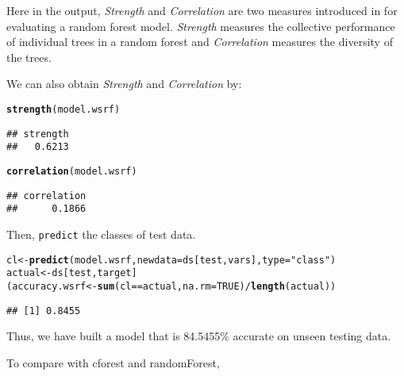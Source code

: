 \documentclass[11pt,a4paper]{article}\usepackage{graphicx, color}
\makeatletter
\newcommand{\hlfunctioncall}[1]{\textcolor[rgb]{0.501960784313725,0,0.329411764705882}{\textbf{#1}}}%
\newcommand{\hlstring}[1]{\textcolor[rgb]{0.6,0.6,1}{#1}}%
\newenvironment{kframe}{%
 \def\at@end@of@kframe{}%
 \ifinner\ifhmode%
  \def\at@end@of@kframe{\end{minipage}}%
  \begin{minipage}{\columnwidth}%
 \fi\fi%
 \def\FrameCommand##1{\hskip\@totalleftmargin \hskip-\fboxsep
 \colorbox{shadecolor}{##1}\hskip-\fboxsep
     \hskip-\linewidth \hskip-\@totalleftmargin \hskip\columnwidth}%
 \MakeFramed {\advance\hsize-\width
   \@totalleftmargin\z@ \linewidth\hsize
   \@setminipage}}%
 {\par\unskip\endMakeFramed%
 \at@end@of@kframe}
\newenvironment{knitrout}{}{} %
\newcommand{\code}[1]{\texttt{#1}}
\newcommand{\pkg}[1]{{\fontseries{b}\selectfont #1}}
\makeatother
\begin{document}
Here in the output, \textit{Strength} and \textit{Correlation} are two
measures introduced in \cite{breiman2001random} for evaluating a
random forest model.  \textit{Strength} measures the collective
performance of individual trees in a random forest and
\textit{Correlation} measures the diversity of the trees.

We can also obtain \textit{Strength} and \textit{Correlation} by:

\begin{knitrout}
\color{fgcolor}\begin{kframe}
\begin{alltt}
\hlfunctioncall{strength}(model.wsrf)
\end{alltt}
\begin{verbatim}
## strength 
##   0.6213
\end{verbatim}
\begin{alltt}
\hlfunctioncall{correlation}(model.wsrf)
\end{alltt}
\begin{verbatim}
## correlation 
##      0.1866
\end{verbatim}
\end{kframe}
\end{knitrout}


Then, \code{predict} the classes of test data.

\begin{knitrout}
\color{fgcolor}\begin{kframe}
\begin{alltt}
cl <- \hlfunctioncall{predict}(model.wsrf, newdata=ds[test, vars], type=\hlstring{"class"})
actual <- ds[test, target]
(accuracy.wsrf <- \hlfunctioncall{sum}(cl == actual, na.rm=TRUE)/\hlfunctioncall{length}(actual))
\end{alltt}
\begin{verbatim}
## [1] 0.8455
\end{verbatim}
\end{kframe}
\end{knitrout}


Thus, we have built a model that is 84.5455\% accurate on
unseen testing data.

To compare with \pkg{cforest} and \pkg{randomForest},
\end{document}
